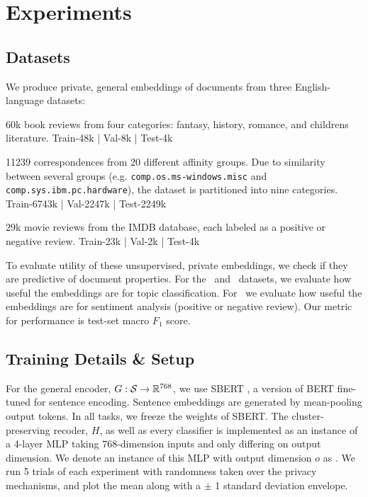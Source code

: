 \section{Experiments}
\label{sec:experiments}
\subsection{Datasets}
\label{sec: datasets} 
We produce private, general embeddings of documents from three English-language datasets: 

\textbf{\goodreads} \cite{goodreads} 60k book reviews from four categories: fantasy, history, romance, and childrens literature.  Train-48k | Val-8k | Test-4k 

\textbf{\tnews} \cite{20newsgroup} 11239 correspondences from 20 different affinity groups. Due to similarity between several groups (e.g. \texttt{comp.os.ms-windows.misc} and \texttt{comp.sys.ibm.pc.hardware}), the dataset is partitioned into nine categories. Train-6743k | Val-2247k | Test-2249k

\textbf{\imdb} \cite{imdb} 29k movie reviews from the IMDB database, each labeled as a positive or negative review. Train-23k | Val-2k | Test-4k 

To evaluate utility of these unsupervised, private embeddings, we check if they are predictive of document properties. For the \goodreads\ and \tnews\ datasets, we evaluate how useful the embeddings are for topic classification. For \imdb\ we evaluate how useful the embeddings are for sentiment analysis (positive or negative review). Our metric for performance is test-set macro $F_1$ score. 

\subsection{Training Details \& Setup}
For the general encoder, $G:\mathcal{S} \rightarrow {\mathbb R}^{768}$, we use SBERT \cite{sbert}, a version of BERT fine-tuned for sentence encoding. Sentence embeddings are generated by mean-pooling output tokens. In all tasks, we freeze the weights of SBERT. The cluster-preserving recoder, $H$, as well as every classifier is implemented as an instance of a 4-layer MLP taking $768$-dimension inputs and only differing on output dimension. We denote an instance of this MLP with output dimension $o$ as . We run 5 trials of each experiment with randomness taken over the privacy mechanisms, and plot the mean along with a $\pm$ 1 standard deviation envelope. 

